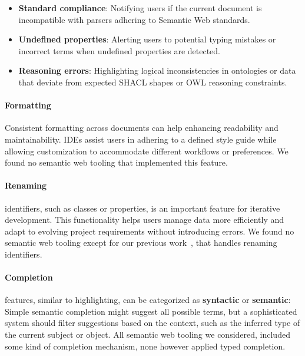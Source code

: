 \begin{itemize}
    \item \textbf{Standard compliance}: Notifying users if the current document is incompatible with parsers adhering to Semantic Web standards.
    \item \textbf{Undefined properties}: Alerting users to potential typing mistakes or incorrect terms when undefined properties are detected.
    \item \textbf{Reasoning errors}: Highlighting logical inconsistencies in ontologies or data that deviate from expected SHACL shapes or OWL reasoning constraints.
\end{itemize}


\paragraph*{Formatting} 
Consistent formatting across documents can help enhancing readability and maintainability.
IDEs assist users in adhering to a defined style guide while allowing customization to accommodate different workflows or preferences.
We found no semantic web tooling that implemented this feature.

\paragraph*{Renaming} identifiers, such as classes or properties, is an important feature for iterative development.
This functionality helps users manage data more efficiently and adapt to evolving project requirements without introducing errors.
We found no semantic web tooling except for our previous work~\cite{JSONLD-LSP}, that handles renaming identifiers.

\paragraph*{Completion} features, similar to highlighting, can be categorized as \textbf{syntactic} or \textbf{semantic}:
Simple semantic completion might suggest all possible terms, but a sophisticated system should filter suggestions based on the context, such as the inferred type of the current subject or object.
All semantic web tooling we considered, included some kind of completion mechanism, none however applied typed completion.


